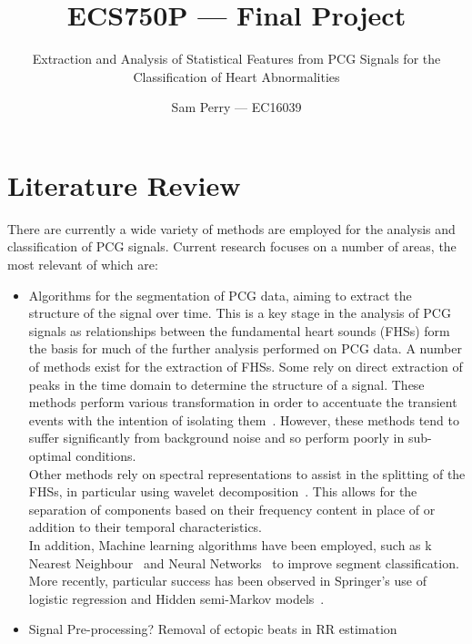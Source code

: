 \documentclass[titlepage]{scrartcl}
\begin{document}
\title{ECS750P --- Final Project}
\subtitle{\LARGE{Extraction and Analysis of Statistical Features from PCG
Signals for the Classification of Heart Abnormalities}}
\author{Sam Perry --- EC16039}

\maketitle

\section{Literature Review}
There are currently a wide variety of methods are employed for the analysis and
classification of PCG signals. Current research focuses on a number of areas,
the most relevant of which are:
\begin{itemize}
    \item Algorithms for the segmentation of PCG data, aiming to extract the
        structure of the signal over time. This is a key stage in the analysis
        of PCG signals as relationships between the fundamental heart sounds
        (FHSs) form the basis for much of the further analysis performed on PCG
        data. A number of methods exist for the extraction of FHSs. Some rely
        on direct extraction of peaks in the time domain to determine the
        structure of a signal. These methods perform various transformation in
        order to accentuate the transient events with the intention of
        isolating them~\parencite{Groch1992, Liang1997}. However, these methods
        tend to suffer significantly from background noise and so perform
        poorly in sub-optimal conditions.\\
        Other methods rely on spectral representations to assist in the
        splitting of the FHSs, in particular using wavelet
        decomposition~\parencite{LiangHuiying1997, Vepa2008}. This allows for
        the separation of components based on their frequency content in
        place of or addition to their temporal characteristics.\\
        In addition,  Machine learning algorithms have been employed, such as k
        Nearest Neighbour~\parencite{Gupta2007} and Neural
        Networks~\parencite{Oskiper2002} to improve segment classification.
        More recently, particular success has been observed in Springer's use
        of logistic regression and Hidden semi-Markov
        models~\citeyearpar{Springer2016}.
    \item Signal Pre-processing?
        Removal of ectopic beats in RR estimation~\parencite{Dash2009}


\end{itemize}
\end{document}
